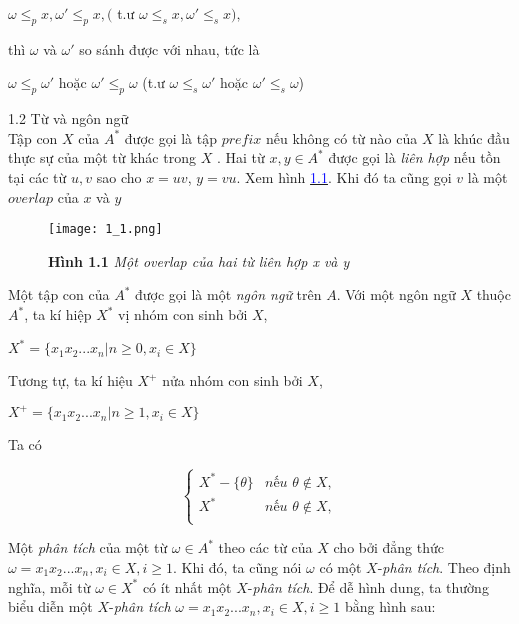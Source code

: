 $\omega \le_p x, \omega' \le_p x, ($ t.ư $ \omega \le_s x, \omega' \le_s x ),$
\begin{flushleft}
thì $\omega$ và $\omega'$ so sánh được với nhau, tức là
\end{flushleft}
$\omega \le_p \omega'$ hoặc $\omega' \le_p \omega $ (t.ư $\omega \le_s \omega'$ hoặc $\omega' \le_s \omega $)
\begin{flushleft}
    1.2 Từ và ngôn ngữ\\
    \hspace{10mm} Tập con $X$ của $A^*$ được gọi là tập $prefix$ nếu không có từ nào của $X$ là khúc đầu thực sự của một từ khác trong $X$ .
    \hspace{10mm} Hai từ $x, y \in A^*$ được gọi là \textit{liên hợp} nếu tồn tại các từ $u, v$ sao cho $x = uv$, $y = vu$. Xem hình \hyperlink{page.12}{\textcolor{blue}{1.1}}. Khi đó ta cũng gọi $v$ là một $overlap$ của $x$ và $y$
    
\end{flushleft}
\begin{figure}[ht]
\texttt{[image: 1\_1.png]}
\caption{\textbf{Hình 1.1} \textit{Một overlap của hai từ liên hợp x và y}}
\end{figure}
\begin{flushleft}
Một tập con của $A^*$ được gọi là một \textit{ngôn ngữ} trên $A$.
Với một ngôn ngữ $X$ thuộc $A^*$, ta kí hiệp $X^*$ vị nhóm con sinh bởi $X$,
\end{flushleft}
$X^* = \{ x_1x_2...x_n | n \ge 0, x_i \in X\}$
\begin{flushleft}
Tương tự, ta kí hiệu $X^+$ nửa nhóm con sinh bởi $X$,
\end{flushleft}
$X^+ = \{ x_1x_2...x_n | n \ge 1, x_i \in X\}$
\begin{flushleft}
Ta có
\end{flushleft}
$$
\begin{cases}
    X^* - \{ \theta \} & \textit{nếu } \theta \not\in X, \\
    X^* & \textit{nếu } \theta \not\in X, \\
\end{cases}
$$
\begin{flushleft}
\hspace{10mm}Một \textit{phân tích} của một từ $\omega \in A^*$ theo các từ của $X$ cho bởi đẳng thức $\omega = x_1x_2...x_n, x_i \in X, i \ge 1$. Khi đó, ta cũng nói $\omega$ có một $X$-\textit{phân tích}. Theo định nghĩa, mỗi từ $\omega \in X^*$ có ít nhất một $X$-\textit{phân tích}. Để dễ hình dung, ta thường biểu diễn một $X$-\textit{phân tích} $\omega = x_1x_2...x_n, x_i \in X, i \ge 1$ bằng hình sau: \\
\end{flushleft}
